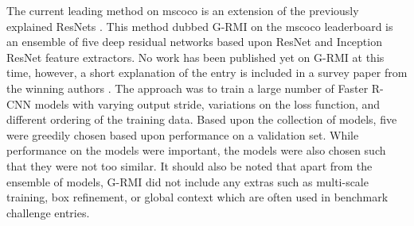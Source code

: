 \documentclass[a4paper,twoside]{article}
\begin{document}
The current leading method on \gls{mscoco} is an extension of the previously explained ResNets \cite{deepres}. This method dubbed G-RMI on the \gls{mscoco} leaderboard \cite{cocolead} is an ensemble of five deep residual networks based upon ResNet \cite{deepres} and Inception ResNet \cite{incepres} feature extractors. No work has been published yet on G-RMI at this time, however, a short explanation of the entry is included in a survey paper from the winning authors \cite{speedacc}. The approach was to train a large number of Faster R-CNN models with varying output stride, variations on the loss function, and different ordering of the training data. Based upon the collection of models, five were greedily chosen based upon performance on a validation set. While performance on the models were important, the models were also chosen such that they were not too similar. It should also be noted that apart from the ensemble of models, G-RMI did not include any extras such as multi-scale training, box refinement, or global context which are often used in benchmark challenge entries.
\\\\
\end{document}
